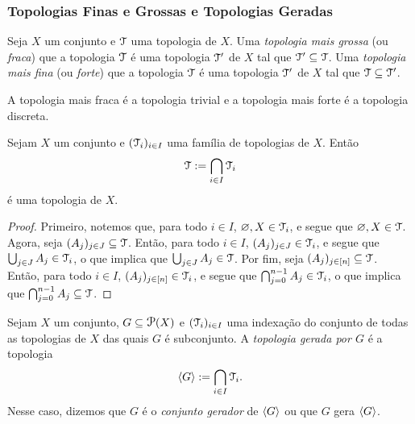 \subsubsection{Topologias Finas e Grossas e Topologias Geradas}

\begin{defi}
	Seja $X$ um conjunto e $\mathcal{T}$ uma topologia de $X$. Uma \emph{topologia mais grossa} (ou \emph{fraca}) que a topologia $\mathcal{T}$ é uma topologia $\mathcal{T}'$ de $X$ tal que $\mathcal{T}' \subseteq \mathcal{T}$. Uma \emph{topologia mais fina} (ou \emph{forte}) que a topologia $\mathcal{T}$ é uma topologia $\mathcal{T}'$ de $X$ tal que $\mathcal{T} \subseteq \mathcal{T}'$.
\end{defi}

	A topologia mais fraca é a topologia trivial e a topologia mais forte é a topologia discreta.

\begin{prop}
	Sejam $X$ um conjunto e $(\mathcal{T}_i)_{i \in I}$ uma família de topologias de $X$. Então
	\begin{equation*}
	\mathcal{T} := \bigcap_{i \in I} \mathcal{T}_i
	\end{equation*}
é uma topologia de $X$.
\end{prop}
\begin{proof}
	Primeiro, notemos que, para todo $i \in I$, $\varnothing,X \in \mathcal{T}_i$, e segue que $\varnothing,X \in \mathcal{T}$. Agora, seja $(A_j)_{j \in J} \subseteq \mathcal{T}$.  Então, para todo $i \in I$, $(A_j)_{j \in J} \in \mathcal{T}_i$, e segue que $\bigcup_{j \in J} A_j \in \mathcal{T}_i$, o que implica que $\bigcup_{j \in J} A_j \in \mathcal{T}$. Por fim, seja $(A_j)_{j \in [n]} \subseteq \mathcal{T}$. Então, para todo $i \in I$, $(A_j)_{j \in [n]} \in \mathcal{T}_i$, e segue que $\bigcap_{j=0}^{n-1} A_j \in \mathcal{T}_i$, o que implica que $\bigcap_{j=0}^{n-1} A_j \subseteq \mathcal{T}$.
\end{proof}




\begin{defi}
Sejam $X$ um conjunto, $G \subseteq \p(X)$ e $(\mathcal{T}_i)_{i \in I}$ uma indexação do conjunto de todas as topologias de $X$ das quais $G$ é subconjunto. A \emph{topologia gerada por $G$} é a topologia
	\begin{equation*}
	\left\langle G \right\rangle := \bigcap_{i \in I} \mathcal{T}_i.
	\end{equation*}
Nesse caso, dizemos que $G$ é o \emph{conjunto gerador} de $\left\langle G \right\rangle$ ou que $G$ gera $\left\langle G \right\rangle$.
\end{defi}

